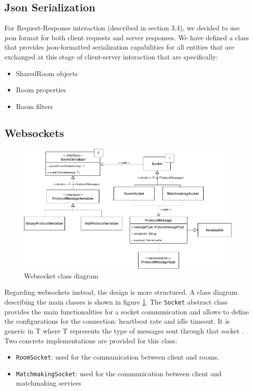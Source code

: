 \subsection{Json Serialization}
For Request-Response interaction (described in section 3.4), we decided to use json format for both client requests and server responses. We have defined a class that provides json-formatted serialization capabilities for all entities that are exchanged at this stage of client-server interaction that are specifically:
\begin{itemize}
	\item SharedRoom objects
	\item Room properties
	\item Room filters
\end{itemize}

\subsection{Websockets}
\begin{figure}[h]
	\hspace*{-0.5in}
	\includegraphics[scale=0.6]{images/4-design/communication_protocol.png}
	\caption{Websocket class diagram}
	\label{fig:websocket_communication_design}
\end{figure}
Regarding websockets instead, the design is more structured. A class diagram describing the main classes is shown in figure \ref{fig:websocket_communication_design}.
The \texttt{Socket} abstract class provides the main functionalities for a socket communication and allows to define the configurations for the connection: heartbeat rate and idle timeout. It is generic in T where T represents the type of messages sent through that socket . Two concrete implementations are provided for this class:
\begin{itemize}
	\item \texttt{RoomSocket}: used for the communication between client and rooms.
	\item \texttt{MatchmakingSocket}: used for the communication between client and matchmaking services
\end{itemize}
